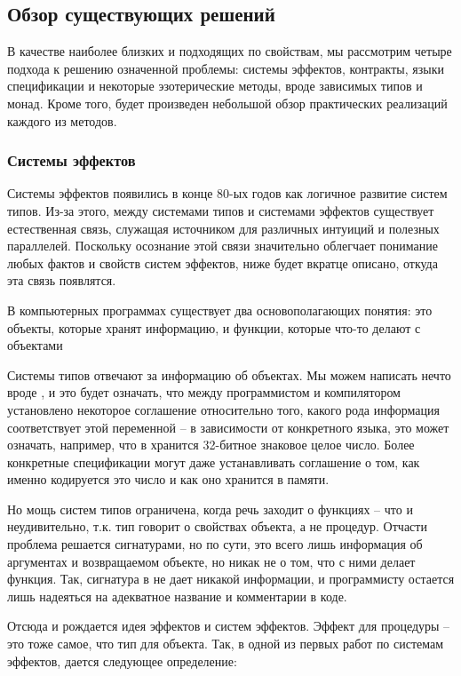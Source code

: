 \subsection{Обзор существующих решений}

В качестве наиболее близких и подходящих по свойствам, мы рассмотрим четыре подхода к решению означенной проблемы: системы эффектов, контракты, языки спецификации и некоторые эзотерические методы, вроде зависимых типов и монад. Кроме того, будет произведен небольшой обзор практических реализаций каждого из методов.

\subsubsection{Системы эффектов}

Системы эффектов появились в конце 80-ых годов как логичное развитие систем типов. Из-за этого, между системами типов и системами эффектов существует естественная связь, служащая источником для различных интуиций и полезных параллелей. Поскольку осознание этой связи значительно облегчает понимание любых фактов и свойств систем эффектов, ниже будет вкратце описано, откуда эта связь появлятся.

\bigskip

В компьютерных программах существует два основополагающих понятия: это объекты, которые хранят информацию, и функции, которые что-то делают с объектами

Системы типов отвечают за информацию об объектах. Мы можем написать нечто вроде , и это будет означать, что между программистом и компилятором установлено некоторое соглашение относительно того, какого рода информация соответствует этой переменной -- в зависимости от конкретного языка, это может означать, например, что в  хранится 32-битное знаковое целое число. Более конкретные спецификации могут даже устанавливать соглашение о том, как именно кодируется это число и как оно хранится в памяти.

Но мощь систем типов ограничена, когда речь заходит о функциях -- что и неудивительно, т.к. тип говорит о свойствах объекта, а не процедур. Отчасти проблема решается сигнатурами, но по сути, это всего лишь информация об аргументах и возвращаемом объекте, но никак не о том, что с ними делает функция. Так, сигнатура  в  не дает никакой информации, и программисту остается лишь надеяться на адекватное название и комментарии в коде.

Отсюда и рождается идея эффектов и систем эффектов. Эффект для процедуры -- это тоже самое, что тип для объекта. Так, в одной из первых работ по системам эффектов, дается следующее определение:


